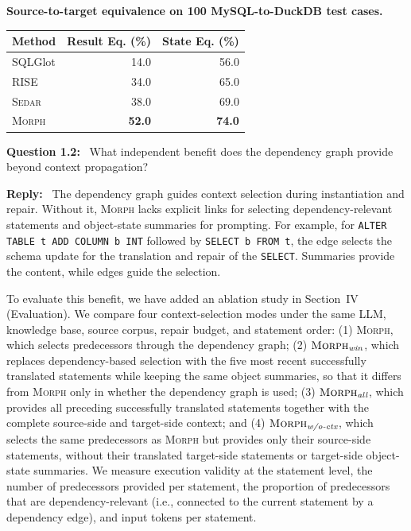 \documentclass[12pt,letterpaper]{article}
\renewcommand{\arraystretch}{1.15}
\newcommand{\morph}{\textsc{Morph}}
\newcommand{\sedar}{\textsc{Sedar}}
\newcommand{\tool}{\morph}
\newcommand{\reviewstart}{\par\addvspace{0.85\baselineskip}\Needspace{4\baselineskip}\noindent}
\newcounter{commentanchor}
\newcommand{\reviewquestion}[1]{\reviewstart\renewcommand{\thecommentanchor}{#1}\refstepcounter{commentanchor}\label{question:#1}\textbf{Question #1:}\ }
\newcommand{\reply}{\par\nobreak\noindent\textbf{Reply:}\ }
\begin{document}
\begin{center}
\begin{minipage}{0.55\linewidth}
\centering\scriptsize\renewcommand{\arraystretch}{1.0}
\textbf{Source-to-target equivalence on 100 MySQL-to-DuckDB test cases.}
\par\smallskip
\begin{tabular}{lrr}
\toprule
Method & Result Eq. (\%) & State Eq. (\%) \\
\midrule
SQLGlot & 14.0 & 56.0 \\
RISE & 34.0 & 65.0 \\
\sedar{} & 38.0 & 69.0 \\
\tool{} & \textbf{52.0} & \textbf{74.0} \\
\bottomrule
\end{tabular}
\end{minipage}
\end{center}

\reviewquestion{1.2} What independent benefit does the dependency graph provide beyond context propagation?

\reply
The dependency graph guides context selection during instantiation and repair. Without it, \tool{} lacks explicit links for selecting dependency-relevant statements and object-state summaries for prompting. For example, for \texttt{ALTER TABLE t ADD COLUMN b INT} followed by \texttt{SELECT b FROM t}, the edge selects the schema update for the translation and repair of the \texttt{SELECT}. Summaries provide the content, while edges guide the selection.

To evaluate this benefit, we have added an ablation study in Section~IV (Evaluation). We compare four context-selection modes under the same LLM, knowledge base, source corpus, repair budget, and statement order: (1) \tool{}, which selects predecessors through the dependency graph; (2) $\tool{}_{\textit{win}}$, which replaces dependency-based selection with the five most recent successfully translated statements while keeping the same object summaries, so that it differs from \tool{} only in whether the dependency graph is used; (3) $\tool{}_{\textit{all}}$, which provides all preceding successfully translated statements together with the complete source-side and target-side context; and (4) $\tool{}_{\textit{w/o-ctx}}$, which selects the same predecessors as \tool{} but provides only their source-side statements, without their translated target-side statements or target-side object-state summaries. We measure execution validity at the statement level, the number of predecessors provided per statement, the proportion of predecessors that are dependency-relevant (i.e., connected to the current statement by a dependency edge), and input tokens per statement.
\end{document}
